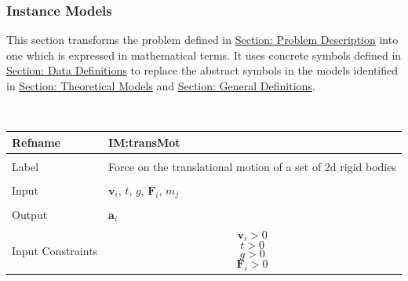 \documentclass[12pt]{article}
\begin{document}
\subsubsection{Instance Models}
\label{Sec:IMs}
This section transforms the problem defined in \hyperref[Sec:ProbDesc]{Section: Problem Description} into one which is expressed in mathematical terms. It uses concrete symbols defined in \hyperref[Sec:DDs]{Section: Data Definitions} to replace the abstract symbols in the models identified in \hyperref[Sec:TMs]{Section: Theoretical Models} and \hyperref[Sec:GDs]{Section: General Definitions}.
\par~

\noindent \begin{minipage}{\textwidth}
\begin{tabular}{p{} p{}}
\toprule \textbf{Refname} & \textbf{IM:transMot}
\label{IM:transMot}
\\ \midrule \\
Label & Force on the translational motion of a set of 2d rigid bodies
        \\ \midrule \\
        Input & ${\mathbf{v}_{i}}$, $t$, $g$, ${\mathbf{F}_{i}}$, ${m_{j}}$
                \\ \midrule \\
                Output & ${\mathbf{a}_{i}}$
                         \\ \midrule \\
                         Input Constraints & \begin{displaymath}
                                             {\mathbf{v}_{i}}>0
                                             \end{displaymath}
                                             \begin{displaymath}
                                             t>0
                                             \end{displaymath}
                                             \begin{displaymath}
                                             g>0
                                             \end{displaymath}
                                             \begin{displaymath}
                                             {\mathbf{F}_{i}}>0
                                             \end{displaymath}

\end{tabular}
\end{minipage}
\end{document}
